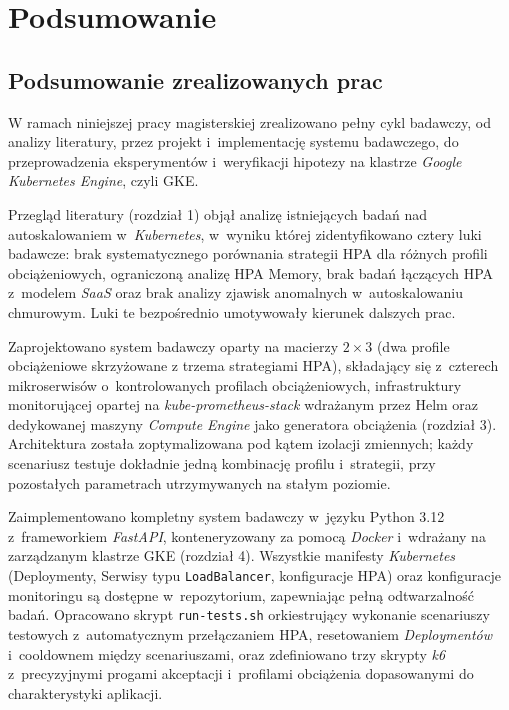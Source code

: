 \chapter{Podsumowanie}

\section{Podsumowanie zrealizowanych prac}

W ramach niniejszej pracy magisterskiej zrealizowano pełny cykl badawczy, od analizy literatury, przez projekt i~implementację systemu badawczego, do przeprowadzenia eksperymentów i~weryfikacji hipotezy na klastrze \textit{Google Kubernetes Engine}, czyli GKE.

Przegląd literatury (rozdział 1) objął analizę istniejących badań nad autoskalowaniem w~\textit{Kubernetes}, w~wyniku której zidentyfikowano cztery luki badawcze: brak systematycznego porównania strategii HPA dla różnych profili obciążeniowych, ograniczoną analizę HPA Memory, brak badań łączących HPA z~modelem \textit{SaaS} oraz brak analizy zjawisk anomalnych w~autoskalowaniu chmurowym. Luki te bezpośrednio umotywowały kierunek dalszych prac.

Zaprojektowano system badawczy oparty na macierzy $2 \times 3$ (dwa profile obciążeniowe skrzyżowane z trzema strategiami HPA), składający się z~czterech mikroserwisów o~kontrolowanych profilach obciążeniowych, infrastruktury monitorującej opartej na \textit{kube-prometheus-stack} wdrażanym przez Helm oraz dedykowanej maszyny \textit{Compute Engine} jako generatora obciążenia (rozdział 3). Architektura została zoptymalizowana pod kątem izolacji zmiennych; każdy scenariusz testuje dokładnie jedną kombinację profilu i~strategii, przy pozostałych parametrach utrzymywanych na stałym poziomie.

Zaimplementowano kompletny system badawczy w~języku Python 3.12 z~frameworkiem \textit{FastAPI}, konteneryzowany za pomocą \textit{Docker} i~wdrażany na zarządzanym klastrze GKE (rozdział 4). Wszystkie manifesty \textit{Kubernetes} (Deploymenty, Serwisy typu \texttt{LoadBalancer}, konfiguracje HPA) oraz konfiguracje monitoringu są dostępne w~repozytorium, zapewniając pełną odtwarzalność badań. Opracowano skrypt \texttt{run-tests.sh} orkiestrujący wykonanie scenariuszy testowych z~automatycznym przełączaniem HPA, resetowaniem \textit{Deploymentów} i~cooldownem między scenariuszami, oraz zdefiniowano trzy skrypty \textit{k6} z~precyzyjnymi progami akceptacji i~profilami obciążenia dopasowanymi do charakterystyki aplikacji.

